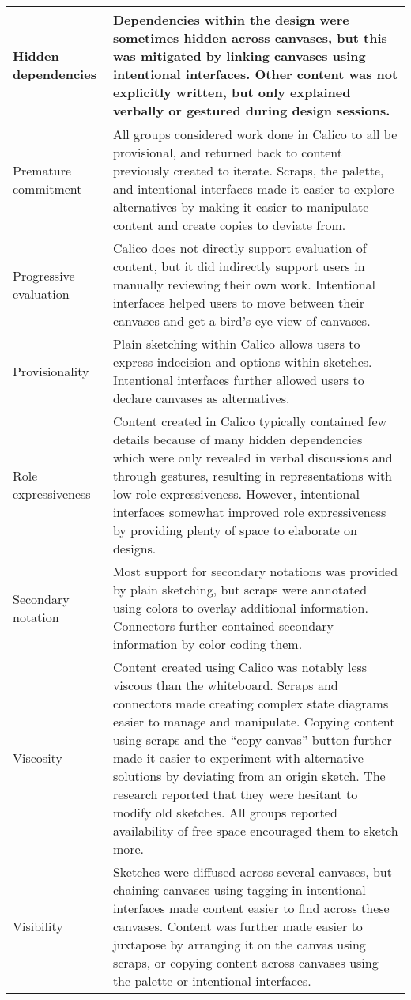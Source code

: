 \begin{center}
\begin{longtable}{|p{4cm}|p{12cm}|}
\hline
Hidden dependencies	&Dependencies within the design were sometimes hidden across canvases, but this was mitigated by linking canvases using intentional interfaces. Other content was not explicitly written, but only explained verbally or gestured during design sessions. \\
\hline
Premature commitment &All groups considered work done in Calico to all be provisional, and returned back to content previously created to iterate. Scraps, the palette, and intentional interfaces made it easier to explore alternatives by making it easier to manipulate content and create copies to deviate from. \\
\hline
Progressive evaluation &Calico does not directly support evaluation of content, but it did indirectly support users in manually reviewing their own work. Intentional interfaces helped users to move between their canvases and get a bird's eye view of canvases. \\
\hline
Provisionality &Plain sketching within Calico allows users to express indecision and options within sketches. Intentional interfaces further allowed users to declare canvases as alternatives. \\
\hline
Role expressiveness &Content created in Calico typically contained few details because of many hidden dependencies which were only revealed in verbal discussions and through gestures, resulting in representations with low role expressiveness. However, intentional interfaces somewhat improved role expressiveness by providing plenty of space to elaborate on designs.  \\
\hline
Secondary notation &Most support for secondary notations was provided by plain sketching, but scraps were annotated using colors to overlay additional information. Connectors further contained secondary information by color coding them. \\
\hline
Viscosity &Content created using Calico was notably less viscous than the whiteboard. Scraps and connectors made creating complex state diagrams easier to manage and manipulate. Copying content using scraps and the ``copy canvas'' button further made it easier to experiment with alternative solutions by deviating from an origin sketch. The research reported that they were hesitant to modify old sketches. All groups reported availability of free space encouraged them to sketch more. \\
\hline
Visibility &Sketches were diffused across several canvases, but chaining canvases using tagging in intentional interfaces made content easier to find across these canvases. Content was further made easier to juxtapose by arranging it on the canvas using scraps, or copying content across canvases using the palette or intentional interfaces.
\label{table:discussion:cognitivedimensions}
\end{longtable}
\end{center}

